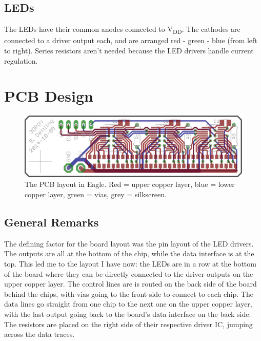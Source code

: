 \documentclass[a4paper, 11pt, titlepage]{report}
\def \vdd {V\textsubscript{DD}}
\begin{document}
\subsection{LEDs}

The LEDs have their common anodes connected to \vdd. The cathodes are connected to a driver output
each, and are arranged red - green - blue (from left to right). Series resistors aren't needed
because the LED drivers handle current regulation.












\section{PCB Design}

\begin{figure}[h]
\vspace{4mm}
\includegraphics[width=\textwidth]{./images/board-layout.png}
\vspace{-6mm}
\caption{The PCB layout in Eagle. Red = upper copper layer, blue = lower copper layer,
green = vias, grey = silkscreen.}
\vspace{6mm}
\end{figure}

\subsection{General Remarks}

The defining factor for the board layout was the pin layout of the LED drivers. The outputs are all
at the bottom of the chip, while the data interface is at the top. This led me to the layout I have
now: the LEDs are in a row at the bottom of the board where they can be directly connected to the
driver outputs on the upper copper layer. The control lines are is routed on the back side of the
board behind the chips, with vias going to the front side to connect to each chip. The data lines
go straight from one chip to the next one on the upper copper layer, with the last output going
back to the board's data interface on the back side. The resistors are placed on the right side of
their respective driver IC, jumping across the data traces.
\end{document}
